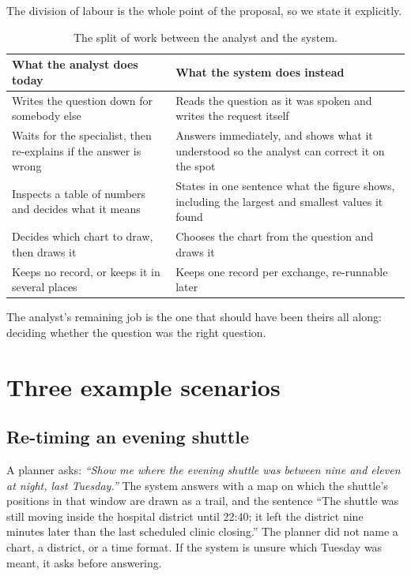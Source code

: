 \documentclass[12pt,a4paper]{report}
\begin{document}
The division of labour is the whole point of the proposal, so we state it
explicitly.

\begin{table}[H]
  \centering
  \caption{The split of work between the analyst and the system.}
  \label{tab:split}
  \begin{tabular}{@{}p{7.2cm}p{7.8cm}@{}}
    \toprule[1.5pt]
    \textbf{What the analyst does today} & \textbf{What the system does instead} \\
    \midrule
    Writes the question down for somebody else &
      Reads the question as it was spoken and writes the request itself \\
    \addlinespace
    Waits for the specialist, then re-explains if the answer is wrong &
      Answers immediately, and shows what it understood so the analyst can
      correct it on the spot \\
    \addlinespace
    Inspects a table of numbers and decides what it means &
      States in one sentence what the figure shows, including the largest and
      smallest values it found \\
    \addlinespace
    Decides which chart to draw, then draws it &
      Chooses the chart from the question and draws it \\
    \addlinespace
    Keeps no record, or keeps it in several places &
      Keeps one record per exchange, re-runnable later \\
    \bottomrule[1.5pt]
  \end{tabular}
\end{table}

The analyst's remaining job is the one that should have been theirs all along:
deciding whether the question was the right question.

\section{Three example scenarios}

\subsection{Re-timing an evening shuttle}

A planner asks: \emph{``Show me where the evening shuttle was between nine and
eleven at night, last Tuesday.''} The system answers with a map on which the
shuttle's positions in that window are drawn as a trail, and the sentence ``The
shuttle was still moving inside the hospital district until 22:40; it left the
district nine minutes later than the last scheduled clinic closing.'' The
planner did not name a chart, a district, or a time format. If the system is
unsure which Tuesday was meant, it asks before answering.
\end{document}
